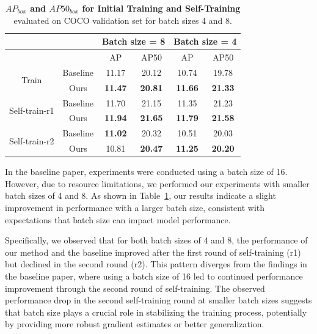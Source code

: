 \begin{table}[htbp]
	\centering
	\begin{tabular}{c|c|cc|cc}
		\toprule
		& & \multicolumn{2}{c|}{Batch size = 8} & \multicolumn{2}{c}{Batch size = 4} \\ \midrule
		& & AP & AP50 & AP & AP50 \\ \midrule
		\multirow{2}{*}{Train} & Baseline & 11.17 & 20.12 & 10.74 & 19.78 \\ 
		& Ours & \textbf{11.47} & \textbf{20.81} & \textbf{11.66} & \textbf{21.33} \\ \midrule
		\multirow{2}{*}{Self-train-r1} & Baseline & 11.70 & 21.15 & 11.35 & 21.23 \\ 
		& Ours & \textbf{11.94} & \textbf{21.65} & \textbf{11.79} & \textbf{21.58} \\ \midrule
		\multirow{2}{*}{Self-train-r2} & Baseline & \textbf{11.02} & 20.32 & 10.51 & 20.03 \\ 
		& Ours & 10.81 & \textbf{20.47} & \textbf{11.25} & \textbf{20.20 }\\ \bottomrule
	\end{tabular}
	\caption[\textbf{\(AP_{box}\) and \(AP50_{box}\) for Initial Training and Self-Training for Different Batch Sizes}]{\textbf{\(AP_{box}\) and \(AP50_{box}\) for Initial Training and Self-Training} evaluated on COCO validation set for batch sizes 4 and 8.}
	\label{tab:batch_size_table}
\end{table}

In the baseline paper, experiments were conducted using a batch size of 16. However, due to resource limitations, we performed our experiments with smaller batch sizes of 4 and 8. As shown in Table~\ref{tab:batch_size_table}, our results indicate a slight improvement in performance with a larger batch size, consistent with expectations that batch size can impact model performance.

Specifically, we observed that for both batch sizes of 4 and 8, the performance of our method and the baseline improved after the first round of self-training (r1) but declined in the second round (r2). This pattern diverges from the findings in the baseline paper, where using a batch size of 16 led to continued performance improvement through the second round of self-training. The observed performance drop in the second self-training round at smaller batch sizes suggests that batch size plays a crucial role in stabilizing the training process, potentially by providing more robust gradient estimates or better generalization.

